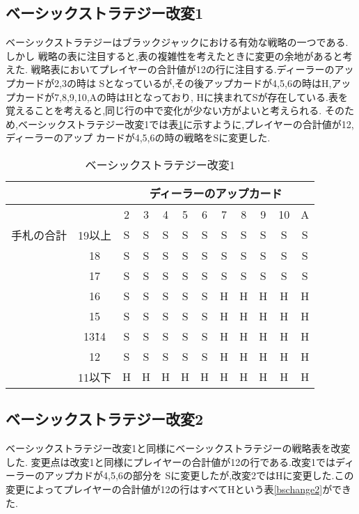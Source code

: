 \subsection{ベーシックストラテジー改変1}
ベーシックストラテジーはブラックジャックにおける有効な戦略の一つである.しかし
戦略の表に注目すると,表の複雑性を考えたときに変更の余地があると考えた.
戦略表においてプレイヤーの合計値が12の行に注目する.ディーラーのアップカードが2,3の時は
Sとなっているが,その後アップカードが4,5,6の時はH,アップカードが7,8,9,10,Aの時はHとなっており,
Hに挟まれてSが存在している.表を覚えることを考えると,同じ行の中で変化が少ない方がよいと考えられる.
そのため,ベーシックストラテジー改変1では表\ref{bschange1}に示すように,プレイヤーの合計値が12,ディーラーのアップ
カードが4,5,6の時の戦略をSに変更した.

\begin{table}[htbp]
  \centering
  \caption{ベーシックストラテジー改変1\label{bschange1}}
  \begin{tabular}{|c|c|c|c|c|c|c|c|c|c|c|c|}
    \hline
    \multicolumn{2}{|c|}{} & \multicolumn{10}{|c|}{ディーラーのアップカード} \\ \hline
    \multicolumn{2}{|c|}{} & 2 & 3 & 4 & 5 & 6 & 7 & 8 & 9 & 10 & A \\ \hline
    手札の合計 & 19以上 & S & S & S & S & S & S & S & S & S & S \\ \cline{3-12}
              & 18 & S & S & S & S & S & S & S & S & S & S \\ \cline{3-12}
              & 17 & S & S & S & S & S & S & S & S & S & S \\ \cline{3-12}
              & 16 & S & S & S & S & S & H & H & H & H & H \\ \cline{3-12}
              & 15 & S & S & S & S & S & H & H & H & H & H \\ \cline{3-12}
              & 13\~ 14 & S & S & S & S & S & H & H & H & H & H \\ \cline{3-12}
              & 12 & S & S & S & S & S & H & H & H & H & H \\ \cline{3-12}
              & 11以下 & H & H & H & H & H & H & H & H & H & H \\ \hline
  \end{tabular}
\end{table}

\subsection{ベーシックストラテジー改変2}
ベーシックストラテジー改変1と同様にベーシックストラテジーの戦略表を改変した.
変更点は改変1と同様にプレイヤーの合計値が12の行である.改変1ではディーラーのアップカドが4,5,6の部分を
Sに変更したが,改変2ではHに変更した.この変更によってプレイヤーの合計値が12の行はすべてHという表\ref{bschange2}ができた.


